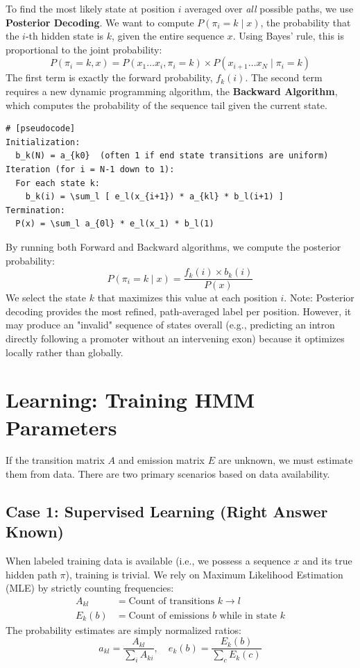 To find the most likely state at position $i$ averaged over \textit{all} possible paths, we use \textbf{Posterior Decoding}.
We want to compute $P(\pi_i=k \mid x)$, the probability that the $i$-th hidden state is $k$, given the entire sequence $x$. Using Bayes' rule, this is proportional to the joint probability:
\[
  P(\pi_i=k, x) = P(x_1 \dots x_i, \pi_i=k) \times P(x_{i+1} \dots x_N \mid \pi_i=k)
\]
The first term is exactly the forward probability, $f_k(i)$. The second term requires a new dynamic programming algorithm, the \textbf{Backward Algorithm}, which computes the probability of the sequence tail given the current state.

\begin{verbatim}
# [pseudocode]
Initialization:
  b_k(N) = a_{k0}  (often 1 if end state transitions are uniform)
Iteration (for i = N-1 down to 1):
  For each state k:
    b_k(i) = \sum_l [ e_l(x_{i+1}) * a_{kl} * b_l(i+1) ]
Termination:
  P(x) = \sum_l a_{0l} * e_l(x_1) * b_l(1)
\end{verbatim}

By running both Forward and Backward algorithms, we compute the posterior probability:
\[
  P(\pi_i=k \mid x) = \frac{f_k(i) \times b_k(i)}{P(x)}
\]
We select the state $k$ that maximizes this value at each position $i$.
\sta Note: Posterior decoding provides the most refined, path-averaged label per position. However, it may produce an "invalid" sequence of states overall (e.g., predicting an intron directly following a promoter without an intervening exon) because it optimizes locally rather than globally.

\section{Learning: Training HMM Parameters}

If the transition matrix $A$ and emission matrix $E$ are unknown, we must estimate them from data. There are two primary scenarios based on data availability.

\subsection{Case 1: Supervised Learning (Right Answer Known)}

When labeled training data is available (i.e., we possess a sequence $x$ and its true hidden path $\pi$), training is trivial. We rely on Maximum Likelihood Estimation (MLE) by strictly counting frequencies:
\begin{align*}
  A_{kl} &= \text{Count of transitions } k \rightarrow l \\
  E_k(b) &= \text{Count of emissions } b \text{ while in state } k
\end{align*}
The probability estimates are simply normalized ratios:
\[
  a_{kl} = \frac{A_{kl}}{\sum_i A_{ki}}, \quad e_k(b) = \frac{E_k(b)}{\sum_c E_k(c)}
\]

